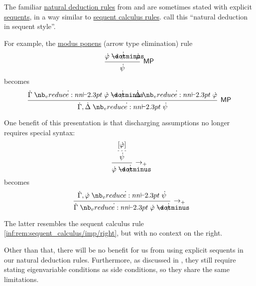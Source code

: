 \begin{remark}\label{rem:natural_deduction_explicit_sequents}
  The familiar \hyperref[def:natural_deduction_rule]{natural deduction rules} from  and  are sometimes stated with explicit \hyperref[def:sequent]{sequents}, in a way similar to \hyperref[def:sequent_calculus_rule]{sequent calculus rules}.  call this \enquote{natural deduction in sequent style}.

  For example, the \hyperref[thm:axiomatic_derivation_as_natural_deduction/mp]{modus ponens} (arrow type elimination) rule
  \begin{equation*}
    \begin{prooftree}
      \hypo{ \syn\varphi \synimplies \syn\psi }
      \hypo{ \syn\varphi }
      \infer2[\ensuremath{ \logic{MP} }]{ \syn\psi }
    \end{prooftree}
  \end{equation*}
  becomes
  \begin{equation*}
    \begin{prooftree}
      \hypo{ \syn\Gamma \synvdash \syn\varphi \synimplies \syn\psi }
      \hypo{ \syn\Delta \synvdash \syn\varphi }
      \infer2[\ensuremath{ \logic{MP} }]{ \syn\Gamma, \syn\Delta \synvdash \syn\psi }
    \end{prooftree}
  \end{equation*}

  One benefit of this presentation is that discharging assumptions no longer requires special syntax:
  \begin{equation*}
    \begin{prooftree}
      \hypo{ [\syn\varphi] }
      \infer[dashed]1{ \syn\psi }
      \infer1[\ensuremath{ \rightarrow_+ }]{ \syn\varphi \synimplies \syn\psi }
    \end{prooftree}
  \end{equation*}
  becomes
  \begin{equation*}
    \begin{prooftree}
      \hypo{ \syn\Gamma, \syn\varphi \synvdash \syn\psi }
      \infer1[\ensuremath{ \rightarrow_+ }]{ \syn\Gamma \synvdash \syn\varphi \synimplies \syn\psi }
    \end{prooftree}
  \end{equation*}

  The latter resembles the sequent calculus rule \ref{inf:rem:sequent_calculus/imp/right}, but with no context on the right.

  Other than that, there will be no benefit for us from using explicit sequents in our natural deduction rules. Furthermore, as discussed in , they still require stating eigenvariable conditions as side conditions, so they share the same limitations.
\end{remark}
